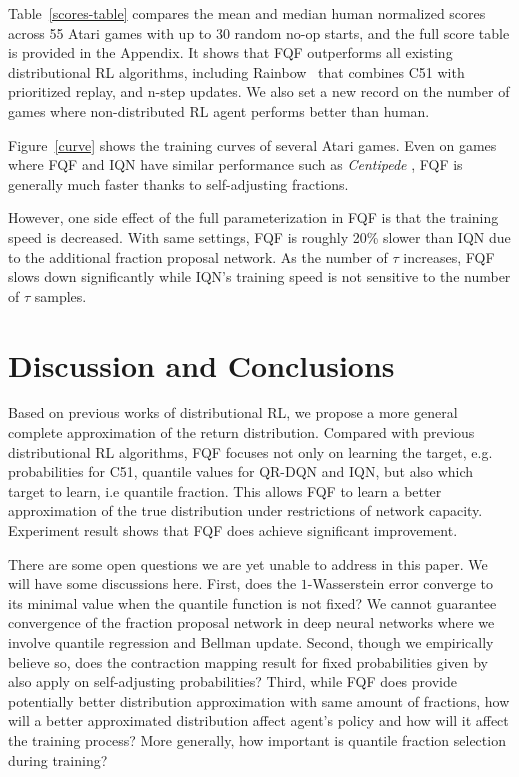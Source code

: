 \documentclass{article}
\begin{document}
Table~\ref{scores-table} compares the mean and median human normalized scores across 55 Atari games with up to 30 random no-op starts, and the full score table is provided in the Appendix. It shows that FQF outperforms all existing distributional RL algorithms, including Rainbow~\citep{hessel2018rainbow} that combines C51 with prioritized replay, and n-step updates. We also set a new record on the number of games where non-distributed RL agent performs better than human. 

Figure~\ref{curve} shows the training curves of several Atari games. Even on games where FQF and IQN have similar performance such as \textit{Centipede} , FQF is generally much faster thanks to self-adjusting fractions. 

However, one side effect of the full parameterization in FQF is that the training speed is decreased. With same settings, FQF is roughly 20\% slower than IQN due to the additional fraction proposal network. As the number of $\tau$ increases, FQF slows down significantly while IQN's training speed is not sensitive to the number of $\tau$ samples.

\section{Discussion and Conclusions}
Based on previous works of distributional RL, we propose a more general complete approximation of the return distribution. Compared with previous distributional RL algorithms, FQF focuses not only on learning the target, e.g. probabilities for C51, quantile values for QR-DQN and IQN, but also which target to learn, i.e quantile fraction. This allows FQF to learn a better approximation of the true distribution under restrictions of network capacity. Experiment result shows that FQF does achieve significant improvement.

There are some open questions we are yet unable to address in this paper. We will have some discussions here. First, does the $1$-Wasserstein error converge to its minimal value when the quantile function is not fixed? We cannot guarantee convergence of the fraction proposal network in deep neural networks where we involve quantile regression and Bellman update. Second, though we empirically believe so, does the contraction mapping result for fixed probabilities given by \cite{dabney2018distributional} also apply on self-adjusting probabilities? Third, while FQF does provide potentially better distribution approximation with same amount of fractions, how will a better approximated distribution affect agent's policy and how will it affect the training process? More generally, how important is quantile fraction selection during training?
\end{document}
